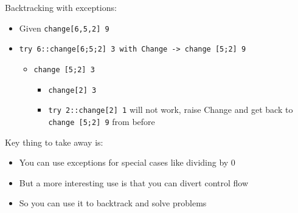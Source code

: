 \documentclass[11pt]{article}
\begin{document}
Backtracking with exceptions:
\begin{itemize}
\item Given \texttt{change[6,5,2] 9}
\item \texttt{try 6::change[6;5;2] 3 with Change -> change [5;2] 9}
\begin{itemize}
\item \texttt{change [5;2] 3}
\begin{itemize}
\item \texttt{change[2] 3}
\item \texttt{try 2::change[2] 1} will not work, raise Change and get back to \texttt{change [5;2] 9} from before
\end{itemize}
\end{itemize}
\end{itemize}
Key thing to take away is:
\begin{itemize}
\item You can use exceptions for special cases like dividing by 0
\item But a more interesting use is that you can divert control flow
\item So you can use it to backtrack and solve problems
\end{itemize}
\end{document}
